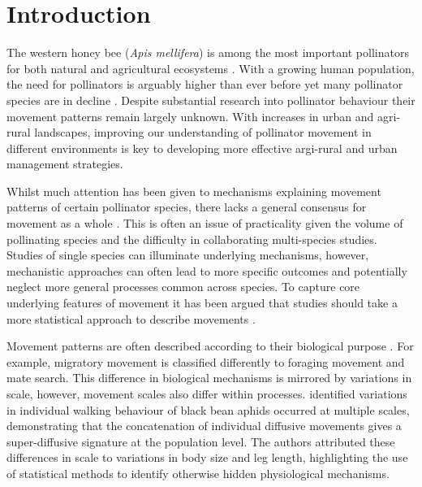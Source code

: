 \documentclass[11pt,usenames,dvipsnames]{article}
\begin{document}
\section{Introduction}

The western honey bee (\textit{Apis mellifera}) is among the most important pollinators for both natural and agricultural ecosystems \citep{Albrecht2018}. With a growing human population, the need for pollinators is arguably higher than ever before yet many pollinator species are in decline \citep{Powney2019}. Despite substantial research into pollinator behaviour their movement patterns remain largely unknown. With increases in urban and agri-rural landscapes, improving our understanding of pollinator movement in different environments is key to developing more effective argi-rural and urban management strategies.  

Whilst much attention has been given to mechanisms explaining movement patterns of certain pollinator species, there lacks a general consensus for movement as a whole \citep{Mueller2008,Nathan2008}. This is often an issue of practicality given the volume of pollinating species and the difficulty in collaborating multi-species studies. Studies of single species can illuminate underlying mechanisms, however, mechanistic approaches can often lead to more specific outcomes and potentially neglect more general processes common across species. To capture core underlying features of movement it has been argued that studies should take a more statistical approach to describe movements . 

Movement patterns are often described according to their biological purpose \citep{Fryxell2008}. For example, migratory movement is classified differently to foraging movement and mate search. This difference in biological mechanisms is mirrored by variations in scale, however, movement scales also differ within processes. \cite{Petrovskii2011} identified variations in individual walking behaviour of black bean aphids occurred at multiple scales, demonstrating that the concatenation of individual diffusive movements gives a super-diffusive signature at the population level. The authors attributed these differences in scale to variations in body size and leg length, highlighting the use of statistical methods to identify otherwise hidden physiological mechanisms.
\end{document}
